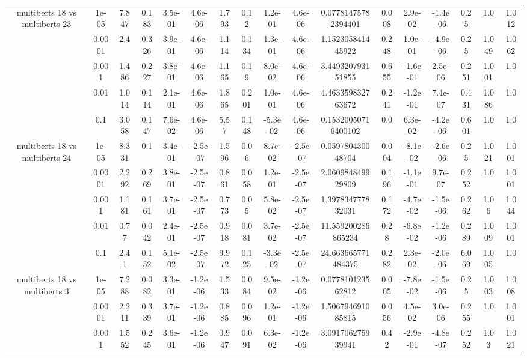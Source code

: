 \begin{tabular}{|c|c|c|c|c|c|c|c|c|c|c|c|c|c|c|c|c|}
\hline
\multirow{5}{*}{multiberts 18 vs multiberts 23} & 1e-05 & 7.847 & 0.183 & 3.5e-01 & 4.6e-06 & 1.793 & 0.12 & 1.2e-01 & 4.6e-06 & 0.07781475782394401 & 0.008 & 2.9e-02 & -1.4e-06 & 0.25 & 1.0 & 1.012 \\
 & 0.0001 & 2.4 & 0.326 & 3.9e-01 & 4.6e-06 & 1.114 & 0.134 & 1.3e-01 & 4.6e-06 & 1.152305841445922 & 0.248 & 1.0e-01 & -4.9e-06 & 0.25 & 1.049 & 1.062 \\
 & 0.001 & 1.486 & 0.227 & 3.8e-01 & 4.6e-06 & 1.165 & 0.19 & 8.0e-02 & 4.6e-06 & 3.449320793151855 & 0.655 & -1.6e-01 & 2.5e-06 & 0.251 & 1.001 & 1.0 \\
 & 0.01 & 1.014 & 0.114 & 2.1e-01 & 4.6e-06 & 1.865 & 0.201 & 1.0e-01 & 4.6e-06 & 4.463359832763672 & 0.241 & -1.2e-01 & 7.4e-07 & 0.431 & 1.086 & 1.0 \\
 & 0.1 & 3.058 & 0.147 & 7.6e-02 & 4.6e-06 & 5.57 & 0.148 & -5.3e-02 & 4.6e-06 & 0.15320050716400102 & 0.0 & 6.3e-02 & -4.2e-06 & 0.601 & 1.0 & 1.0 \\
\hline
\multirow{5}{*}{multiberts 18 vs multiberts 24} & 1e-05 & 8.331 & 0.1 & 3.4e-01 & -2.5e-07 & 1.596 & 0.06 & 8.7e-02 & -2.5e-07 & 0.059780430048704 & 0.004 & -8.1e-02 & -2.6e-06 & 0.25 & 1.021 & 1.001 \\
 & 0.0001 & 2.292 & 0.269 & 3.8e-01 & -2.5e-07 & 0.861 & 0.058 & 1.2e-01 & -2.5e-07 & 2.060984849929809 & 0.196 & -1.1e-01 & 9.7e-07 & 0.252 & 1.0 & 1.001 \\
 & 0.001 & 1.181 & 0.161 & 3.7e-01 & -2.5e-07 & 0.773 & 0.05 & 5.8e-02 & -2.5e-07 & 1.397834777832031 & 0.172 & -4.7e-02 & -1.5e-06 & 0.262 & 1.06 & 1.044 \\
 & 0.01 & 0.77 & 0.042 & 2.4e-01 & -2.5e-07 & 0.918 & 0.081 & 3.7e-02 & -2.5e-07 & 11.559200286865234 & 0.28 & -6.8e-02 & -1.2e-06 & 0.289 & 1.009 & 1.001 \\
 & 0.1 & 2.41 & 0.152 & 5.1e-02 & -2.5e-07 & 9.972 & 0.125 & -3.3e-02 & -2.5e-07 & 24.663665771484375 & 0.282 & 2.3e-02 & -2.0e-06 & 6.069 & 1.005 & 1.0 \\
\hline
\multirow{5}{*}{multiberts 18 vs multiberts 3} & 1e-05 & 7.288 & 0.082 & 3.3e-01 & -1.2e-06 & 1.533 & 0.084 & 9.5e-02 & -1.2e-06 & 0.077810123562812 & 0.005 & -7.8e-02 & -1.5e-06 & 0.25 & 1.003 & 1.008 \\
 & 0.0001 & 2.211 & 0.339 & 3.7e-01 & -1.2e-06 & 0.885 & 0.096 & 1.2e-01 & -1.2e-06 & 1.506794691085815 & 0.056 & 4.5e-02 & 3.0e-06 & 0.255 & 1.0 & 1.001 \\
 & 0.001 & 1.552 & 0.245 & 3.6e-01 & -1.2e-06 & 0.947 & 0.091 & 6.3e-02 & -1.2e-06 & 3.091706275939941 & 0.42 & -2.9e-01 & -4.8e-07 & 0.252 & 1.03 & 1.021 \\

\end{tabular}
